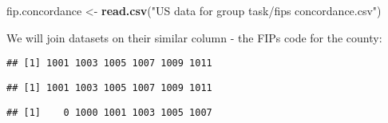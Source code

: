 \documentclass[
]{article}
\newenvironment{Shaded}{\begin{snugshade}}{\end{snugshade}}
\newcommand{\FunctionTok}[1]{\textcolor[rgb]{0.13,0.29,0.53}{\textbf{#1}}}
\newcommand{\NormalTok}[1]{#1}
\newcommand{\OtherTok}[1]{\textcolor[rgb]{0.56,0.35,0.01}{#1}}
\newcommand{\SpecialCharTok}[1]{\textcolor[rgb]{0.81,0.36,0.00}{\textbf{#1}}}
\newcommand{\StringTok}[1]{\textcolor[rgb]{0.31,0.60,0.02}{#1}}
\begin{document}
\begin{Shaded}
\begin{Highlighting}[]
\NormalTok{fip.concordance }\OtherTok{\textless{}{-}} \FunctionTok{read.csv}\NormalTok{(}\StringTok{"US data for group task/fips concordance.csv"}\NormalTok{)}
\end{Highlighting}
\end{Shaded}

\vspace{6mm}

We will join datasets on their similar column - the FIPs code for the
county:

\begin{Shaded}
\end{Shaded}

\begin{verbatim}
## [1] 1001 1003 1005 1007 1009 1011
\end{verbatim}

\begin{Shaded}
\end{Shaded}

\begin{verbatim}
## [1] 1001 1003 1005 1007 1009 1011
\end{verbatim}

\begin{Shaded}
\end{Shaded}

\begin{verbatim}
## [1]    0 1000 1001 1003 1005 1007
\end{verbatim}

\begin{Shaded}
\end{Shaded}
\end{document}
